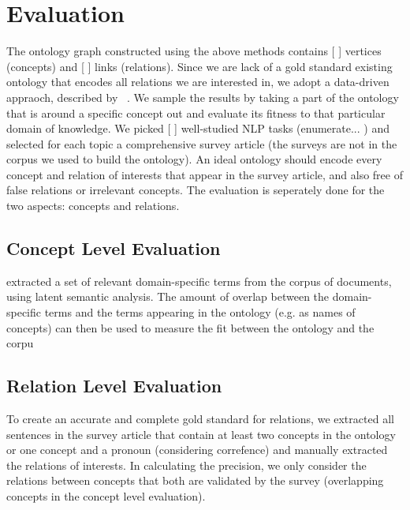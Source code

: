 \section{Evaluation}

The ontology graph constructed using the above methods contains [ ] vertices
(concepts) and [ ] links (relations). Since we are lack of a gold standard existing ontology
that encodes all relations we are interested in, we adopt a data-driven
appraoch, described by ~\cite{brewster_et_al_2004b}.  We sample the results by taking
a part of the ontology that is around a specific concept out and evaluate its
fitness to that particular domain of knowledge. We picked [ ] well-studied NLP tasks
(enumerate... ) and selected for each topic a comprehensive survey article (the
surveys are not in the corpus we used to build the ontology). An ideal ontology
should encode every concept and relation of interests that appear in the survey
article, and also free of false relations or irrelevant concepts. The evaluation 
is seperately done for the two aspects: concepts and relations. 

\subsection{Concept Level Evaluation}
 extracted a set of relevant domain-specific terms from the corpus of documents, 
using latent semantic analysis. The amount of overlap 
between the domain-specific terms and the terms appearing 
in the ontology (e.g. as names of concepts) can then be used 
to measure the fit between the ontology and the corpu

\subsection{Relation Level Evaluation}

To create an accurate and complete gold standard for relations, we extracted all
sentences in the survey article that contain at least two concepts in the
ontology or one concept and a pronoun (considering correfence)
and manually extracted the relations of interests. 
In calculating the precision, we only consider the relations between concepts
that both are validated by the survey (overlapping concepts in the concept level
evaluation).
